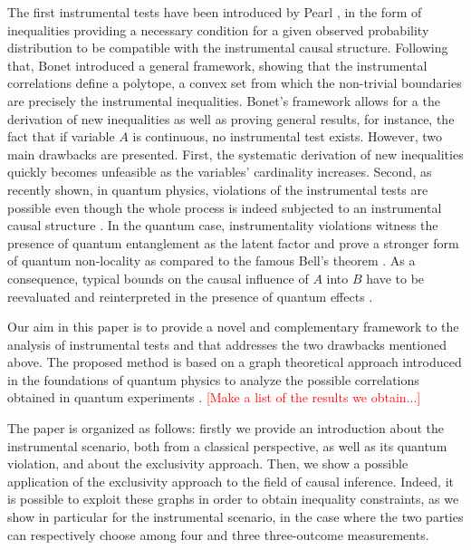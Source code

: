 \documentclass[letterpaper]{article}
\begin{document}
The first instrumental tests have been introduced by Pearl \cite{pearl1995}, in the form of inequalities providing a necessary condition for a given observed probability distribution to be compatible with the instrumental causal structure. Following that, Bonet \cite{bonet2001} introduced a general framework, showing that the instrumental correlations define a polytope, a convex set from which the non-trivial boundaries are precisely the instrumental inequalities. Bonet's framework allows for a the derivation of new inequalities as well as proving general results, for instance, the fact that if variable $A$ is continuous, no instrumental test exists. However, two main drawbacks are presented. First, the systematic derivation of new inequalities quickly becomes unfeasible as the variables' cardinality increases. Second, as recently shown, in quantum physics, violations of the instrumental tests are possible even though the whole process is indeed subjected to an instrumental causal structure \cite{chaves2018, himbeeck2018}. In the quantum case, instrumentality violations witness the presence of quantum entanglement as the latent factor and prove a stronger form of quantum non-locality as compared to the famous Bell's theorem \cite{chaves2018}. As a consequence, typical bounds on the causal influence of $A$ into $B$ have to be reevaluated and reinterpreted in the presence of quantum effects \cite{}.

Our aim in this paper is to provide a novel and complementary framework to the analysis of instrumental tests and that addresses the two drawbacks mentioned above. The proposed method is based on a graph theoretical approach introduced in the foundations of quantum physics to analyze the possible correlations obtained in quantum experiments \cite{}. \textcolor{red}{[Make a list of the results we obtain...]}

The paper is organized as follows: firstly we provide an introduction about the instrumental scenario, both from a classical perspective, as well as its quantum violation, and about the exclusivity approach. Then, we show a possible application of the exclusivity approach to the field of causal inference. Indeed, it is possible to exploit these graphs in order to obtain inequality constraints, as we show in particular for the instrumental scenario, in the case where the two parties can respectively choose among four and three three-outcome measurements.
\end{document}
